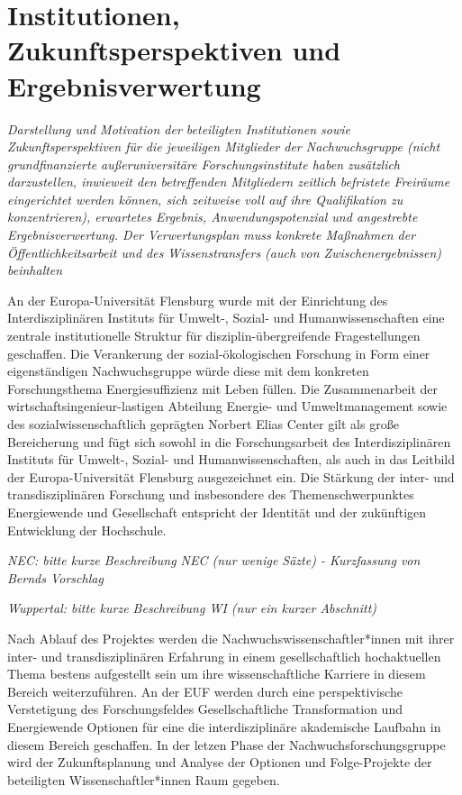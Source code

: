 \documentclass[a4paper,11pt,twoside]{scrartcl}
\begin{document}
\section{Institutionen, Zukunftsperspektiven und Ergebnisverwertung}
\textit{Darstellung und Motivation der beteiligten Institutionen sowie Zukunftsperspektiven für die jeweiligen Mitglieder der Nachwuchsgruppe (nicht grundfinanzierte außeruniversitäre Forschungsinstitute haben zusätzlich darzustellen, inwieweit den betreffenden Mitgliedern zeitlich befristete Freiräume eingerichtet werden können, sich zeitweise voll auf ihre Qualifikation zu konzentrieren), erwartetes Ergebnis, Anwendungspotenzial und angestrebte Ergebnisverwertung. Der Verwertungsplan muss konkrete Maßnahmen der Öffentlichkeitsarbeit und des Wissenstransfers (auch von Zwischenergebnissen) beinhalten}

An der Europa-Universität Flensburg wurde mit der Einrichtung des Interdisziplinären Instituts für Umwelt-, Sozial- und Humanwissenschaften eine zentrale institutionelle Struktur für disziplin-übergreifende Fragestellungen geschaffen. Die Verankerung der sozial-ökologischen Forschung in Form einer eigenständigen Nachwuchsgruppe würde diese mit dem konkreten Forschungsthema Energiesuffizienz mit Leben füllen. Die Zusammenarbeit der wirtschaftsingenieur-lastigen Abteilung Energie- und Umweltmanagement sowie des sozialwissenschaftlich geprägten Norbert Elias Center gilt als große Bereicherung und fügt sich sowohl in die Forschungsarbeit des Interdisziplinären Instituts für Umwelt-, Sozial- und Humanwissenschaften, als auch in das Leitbild der Europa-Universität Flensburg ausgezeichnet ein. Die Stärkung der inter- und transdisziplinären Forschung und insbesondere des Themenschwerpunktes Energiewende und Gesellschaft entspricht der Identität und der zukünftigen Entwicklung der Hochschule.

\textit{NEC: bitte kurze Beschreibung NEC (nur wenige Säzte) - Kurzfassung von Bernds Vorschlag}

\textit{Wuppertal: bitte kurze Beschreibung WI (nur ein kurzer Abschnitt)}

Nach Ablauf des Projektes werden die Nachwuchswissenschaftler*innen mit ihrer inter- und transdisziplinären Erfahrung in einem gesellschaftlich hochaktuellen Thema bestens aufgestellt sein um ihre wissenschaftliche Karriere in diesem Bereich weiterzuführen. An der EUF werden durch eine perspektivische Verstetigung des Forschungsfeldes Gesellschaftliche Transformation und Energiewende Optionen für eine die interdisziplinäre akademische Laufbahn in diesem Bereich geschaffen. In der letzen Phase der Nachwuchsforschungsgruppe wird der Zukunftsplanung und Analyse der Optionen und Folge-Projekte der beteiligten Wissenschaftler*innen Raum gegeben. 
\end{document}
